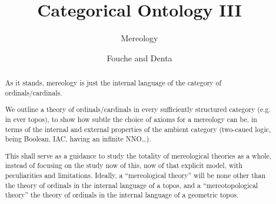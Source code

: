 \documentclass{amsart}
\author{Fouche and Denta}
\title{Categorical Ontology III}
\subtitle{Mereology}
\begin{document}
\maketitle 
\begin{abstract}
  As it stands, mereology is just the internal language of the category of ordinals/cardinals.

  We outline a theory of ordinals/cardinals in every sufficiently structured category (e.g. in ever topos), to show how subtle the choice of axioms for a mereology can be, in terms of the internal and external properties of the ambient category (two-caued logic, being Boolean, IAC, having an infinite NNO\dots).

  This shall serve as a guidance to study the totality of mereological theories as a whole, instead of focusing on the study now of this, now of that explicit model, with peculiarities and limitations. Ideally, a ``mereological theory'' will be none other than the theory of ordinals in the internal language of a topos, and a ``mereotopological theory'' the theory of ordinals in the internal language of a geometric topos.
\end{abstract}
\section{}
\section{}
\section{}
\section{}
\end{document}
